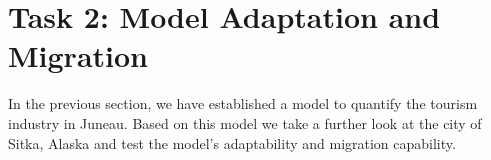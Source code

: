 \section{Task 2: Model Adaptation and Migration}

In the previous section, we have established a model to quantify 
the tourism industry in Juneau. 
Based on this model we take a further look at the city of Sitka, Alaska and
test the model's adaptability and migration capability.